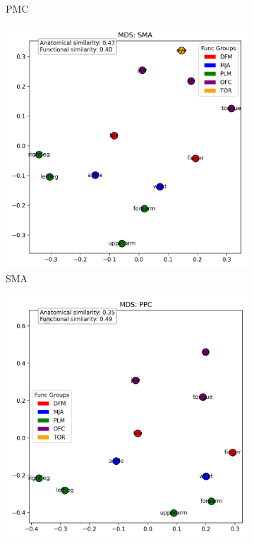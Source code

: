 \documentclass{article}
\begin{document}
\begin{figure}[!htbp]
\begin{subfigure}[b]{0.45\textwidth}
        \caption{PMC}
        \label{fig:mds_pmc}
    \end{subfigure}
    \vspace{0.5em}
    \begin{subfigure}[b]{0.45\textwidth}
        \centering
        \includegraphics[width=\textwidth]{results/mds_sma.png}
        \caption{SMA}
        \label{fig:mds_sma}
    \end{subfigure}
    \hfill
    \begin{subfigure}[b]{0.45\textwidth}
        \centering
        \includegraphics[width=\textwidth]{results/mds_ppc.png}

\end{subfigure}
\end{figure}
\end{document}
